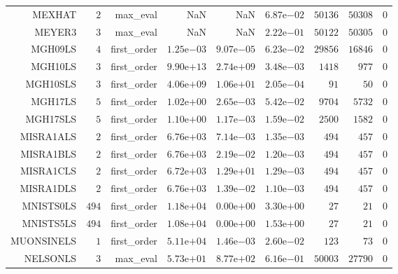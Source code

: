 \begin{longtable}{rrrrrrrrr}
MEXHAT & \(     2\) & max\_eval &       NaN &       NaN & \( 6.87\)e\(-02\) & \( 50136\) & \( 50308\) & \(     0\) \\
MEYER3 & \(     3\) & max\_eval &       NaN &       NaN & \( 2.22\)e\(-01\) & \( 50122\) & \( 50305\) & \(     0\) \\
MGH09LS & \(     4\) & first\_order & \( 1.25\)e\(-03\) & \( 9.07\)e\(-05\) & \( 6.23\)e\(-02\) & \( 29856\) & \( 16846\) & \(     0\) \\
MGH10LS & \(     3\) & first\_order & \( 9.90\)e\(+13\) & \( 2.74\)e\(+09\) & \( 3.48\)e\(-03\) & \(  1418\) & \(   977\) & \(     0\) \\
MGH10SLS & \(     3\) & first\_order & \( 4.06\)e\(+09\) & \( 1.06\)e\(+01\) & \( 2.05\)e\(-04\) & \(    91\) & \(    50\) & \(     0\) \\
MGH17LS & \(     5\) & first\_order & \( 1.02\)e\(+00\) & \( 2.65\)e\(-03\) & \( 5.42\)e\(-02\) & \(  9704\) & \(  5732\) & \(     0\) \\
MGH17SLS & \(     5\) & first\_order & \( 1.10\)e\(+00\) & \( 1.17\)e\(-03\) & \( 1.59\)e\(-02\) & \(  2500\) & \(  1582\) & \(     0\) \\
MISRA1ALS & \(     2\) & first\_order & \( 6.76\)e\(+03\) & \( 7.14\)e\(-03\) & \( 1.35\)e\(-03\) & \(   494\) & \(   457\) & \(     0\) \\
MISRA1BLS & \(     2\) & first\_order & \( 6.76\)e\(+03\) & \( 2.19\)e\(-02\) & \( 1.20\)e\(-03\) & \(   494\) & \(   457\) & \(     0\) \\
MISRA1CLS & \(     2\) & first\_order & \( 6.72\)e\(+03\) & \( 1.29\)e\(+01\) & \( 1.29\)e\(-03\) & \(   494\) & \(   457\) & \(     0\) \\
MISRA1DLS & \(     2\) & first\_order & \( 6.76\)e\(+03\) & \( 1.39\)e\(-02\) & \( 1.10\)e\(-03\) & \(   494\) & \(   457\) & \(     0\) \\
MNISTS0LS & \(   494\) & first\_order & \( 1.18\)e\(+04\) & \( 0.00\)e\(+00\) & \( 3.30\)e\(+00\) & \(    27\) & \(    21\) & \(     0\) \\
MNISTS5LS & \(   494\) & first\_order & \( 1.08\)e\(+04\) & \( 0.00\)e\(+00\) & \( 1.53\)e\(+00\) & \(    27\) & \(    21\) & \(     0\) \\
MUONSINELS & \(     1\) & first\_order & \( 5.11\)e\(+04\) & \( 1.46\)e\(-03\) & \( 2.60\)e\(-02\) & \(   123\) & \(    73\) & \(     0\) \\
NELSONLS & \(     3\) & max\_eval & \( 5.73\)e\(+01\) & \( 8.77\)e\(+02\) & \( 6.16\)e\(-01\) & \( 50003\) & \( 27790\) & \(     0\) \\

\end{longtable}
